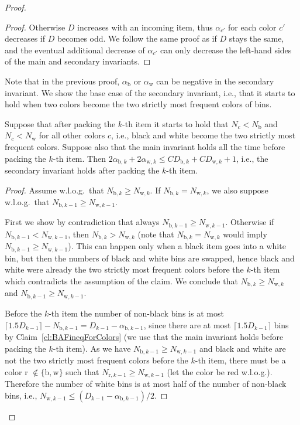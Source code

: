 \documentclass[11pt,a4paper]{article}
\def\vari#1{\mathit{#1}}
\begin{document}
\begin{proof}
\begin{proof}
Otherwise $D$ increases with an incoming item, thus $\alpha_{c'}$ for each color $c'$ decreases
if $D$ becomes odd. We follow the same proof as if $D$ stays the same,
and the eventual additional decrease of $\alpha_{c'}$
can only decrease the left-hand sides of the main and secondary
invariants.
\end{proof}

Note that in the previous proof, $\alpha_{\mathrm{b}}$ or $\alpha_{\mathrm{w}}$
can be negative in the secondary invariant.
We show the base case of the secondary invariant, i.e., that it
starts to hold when two colors become the two strictly most frequent
colors of bins.

\begin{claim}  \label{clm:OptAlgBaseCaseSecondary}
Suppose that after packing the $k$-th item it starts to hold that
$N_c < N_{\mathrm{b}}$ and $N_c < N_{\mathrm{w}}$ for all other colors $c$, i.e.,
black and white become the two strictly most frequent colors.
Suppose also that the main invariant holds all the time before packing the $k$-th item.
Then $2\alpha_{\mathrm{b},k} + 2\alpha_{\mathrm{w},k} \leq \vari{CD}_{\mathrm{b},k} + \vari{CD}_{\mathrm{w},k} + 1$,
i.e., the secondary invariant holds after packing the $k$-th item.
\end{claim}

\begin{proof}
Assume w.l.o.g.\ that $N_{\mathrm{b},k} \geq N_{\mathrm{w},k}$.
If $N_{\mathrm{b},k} = N_{\mathrm{w},k}$, we also suppose w.l.o.g.\ that $N_{\mathrm{b},k-1} \geq N_{\mathrm{w},k-1}$.

First we show by contradiction that always $N_{\mathrm{b},k-1} \geq N_{\mathrm{w},k-1}$. Otherwise if $N_{\mathrm{b},k-1} < N_{\mathrm{w},k-1}$, then $N_{\mathrm{b},k} > N_{\mathrm{w},k}$
(note that $N_{\mathrm{b},k} = N_{\mathrm{w},k}$ would imply $N_{\mathrm{b},k-1} \geq N_{\mathrm{w},k-1}$).
This can happen only when a black item goes into a white bin, but then the numbers of black and white bins are swapped, hence black
and white were already the two strictly most frequent colors before the $k$-th item
which contradicts the assumption of the claim.
We conclude that $N_{\mathrm{b},k} \geq N_{\mathrm{w},k}$ and $N_{\mathrm{b},k-1} \geq N_{\mathrm{w},k-1}$.

Before the $k$-th item the number of non-black bins is at most
$\lceil 1.5D_{k-1}\rceil - N_{\mathrm{b},k-1} = D_{k-1} - \alpha_{\mathrm{b},k-1}$,
since there are at most $\lceil 1.5D_{k-1}\rceil$ bins by Claim~\ref{cl:BAFineqForColors}
(we use that the main invariant holds before packing the $k$-th item).
As we have $N_{\mathrm{b},k-1} \geq N_{\mathrm{w},k-1}$ and
black and white are not the two strictly most frequent colors before the $k$-th item,
there must be a color r $\not\in \{ \mathrm{b}, \mathrm{w} \}$ such that $N_{\mathrm{r},k-1} \geq N_{\mathrm{w},k-1}$
(let the color be red w.l.o.g.). Therefore the number of white bins is at most half of the number of non-black bins,
i.e., $N_{\mathrm{w},k-1} \leq (D_{k-1} - \alpha_{\mathrm{b},k-1})/2$.


\end{proof}
\end{proof}
\end{document}
